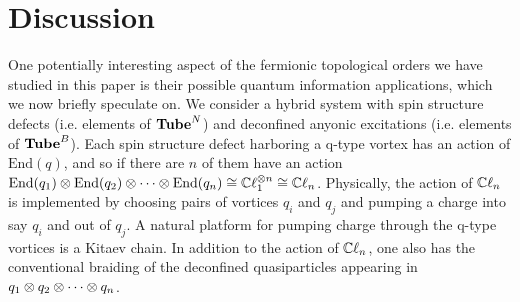 
\section{Discussion} \label{discussion}

One potentially interesting aspect of the fermionic topological orders we have studied in this paper is their possible quantum information 
applications, which we now briefly speculate on. 
We consider a hybrid system with spin structure defects (i.e. elements of $\textbf{Tube}^N$) and deconfined anyonic excitations (i.e. elements of $\textbf{Tube}^B$).
Each spin structure defect harboring a q-type vortex has an action of $\text{End}(q)$, 
and so if there are $n$ of them have an action $\text{End}(q_1) \otimes \text{End}(q_2) \otimes \cdots \otimes \text{End}(q_n) \cong \mathbb{C}\ell_1^{\otimes n} \cong \mathbb{C}\ell_n$.
Physically, the action of $\mathbb{C}\ell_n$ is implemented by choosing pairs of vortices $q_i$ and $q_j$ and pumping a charge into say $q_i$ and out of $q_j$.
A natural platform for pumping charge through the q-type vortices is a Kitaev chain.
In addition to the action of $\mathbb{C}\ell_n$, one also has the conventional braiding of the deconfined quasiparticles appearing in $q_1 \otimes q_2 \otimes \cdots \otimes q_n$.


